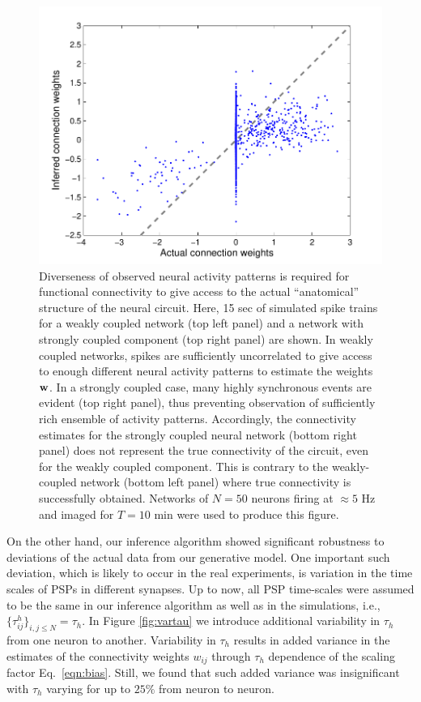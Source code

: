\begin{figure}[h]
\begin{minipage}[c]{0.45\hsize}
\end{minipage}
\begin{minipage}[c]{0.45\hsize}
\includegraphics[width=\hsize]{../figs/FigureA8_strong_corr}
\end{minipage}
\caption{
Diverseness of observed neural activity patterns is required for functional connectivity to give access to the actual ``anatomical'' structure of the neural circuit. Here, 15 sec of simulated spike trains for a weakly coupled network (top left panel) and a network with strongly coupled component (top right panel) are shown. In weakly coupled networks, spikes are sufficiently uncorrelated to give access to enough different neural activity patterns to estimate the weights ${\bf w}$. In a strongly coupled case, many highly synchronous events are evident (top right panel), thus preventing observation of sufficiently rich ensemble of activity patterns. Accordingly, the connectivity estimates for the strongly coupled neural network (bottom right panel) does not represent the true connectivity of the circuit, even for the weakly coupled component. This is contrary to the weakly-coupled network (bottom left panel) where true connectivity is successfully obtained. Networks of $N=50$ neurons firing at $\approx 5$ Hz and imaged for $T=10$ min were used to produce this figure.}
\label{fig:rasters}
\end{figure}

On the other hand, our inference algorithm showed significant robustness to deviations of the actual data from our generative model. One important such deviation, which is likely to occur in the real experiments, is variation in the time scales of PSPs in different synapses. Up to now, all PSP time-scales were assumed to be the same in our inference algorithm as well as in the simulations, i.e., $\{\tau^h_{ij}\}_{i,j\leq N}=\tau_h$. In Figure \ref{fig:vartau} we introduce additional variability in $\tau_h$ from one neuron to another. Variability in $\tau_h$ results in added variance in the estimates of the connectivity weights $w_{ij}$ through $\tau_h$ dependence of the scaling factor Eq.~\eqref{eqn:bias}. Still, we found that such added variance was insignificant with $\tau_h$ varying for up to $25\%$ from neuron to neuron.

